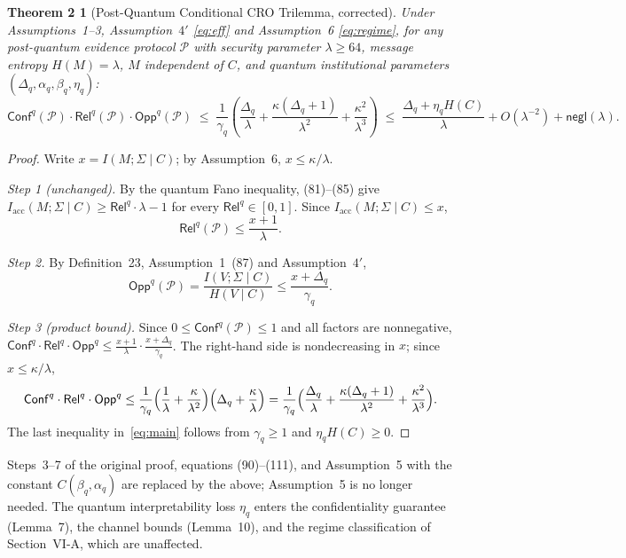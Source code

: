 \documentclass[10pt,a4paper]{article}
\newtheorem*{theoremTwo}{Theorem 2}
\theoremstyle{remark}
\newcommand{\Confq}{\mathsf{Conf}^q}
\newcommand{\Relq}{\mathsf{Rel}^q}
\newcommand{\Oppq}{\mathsf{Opp}^q}
\newcommand{\negl}{\mathsf{negl}}
\newcommand{\cP}{\mathcal{P}}
\newcommand{\IMS}{I(M;\Sigma\mid C)}
\newcommand{\Iacc}{I_{\mathrm{acc}}(M;\Sigma\mid C)}
\begin{document}
\begin{theoremTwo}[Post-Quantum Conditional CRO Trilemma, corrected]
Under Assumptions~1--3, Assumption~$4'$ \eqref{eq:eff} and
Assumption~6 \eqref{eq:regime}, for any post-quantum evidence protocol
$\cP$ with security parameter $\lambda\ge64$, message entropy
$H(M)=\lambda$, $M$ independent of $C$, and quantum institutional
parameters $(\Delta_q,\alpha_q,\beta_q,\eta_q)$:
\begin{equation*}\tag{80$'$}\label{eq:main}
\Confq(\cP)\cdot\Relq(\cP)\cdot\Oppq(\cP)
\;\le\;\frac{1}{\gamma_q}\left(\frac{\Delta_q}{\lambda}
+\frac{\kappa(\Delta_q+1)}{\lambda^{2}}+\frac{\kappa^{2}}{\lambda^{3}}\right)
\;\le\;\frac{\Delta_q+\eta_q H(C)}{\lambda}+O(\lambda^{-2})+\negl(\lambda).
\end{equation*}
\end{theoremTwo}

\begin{proof}
Write $x=\IMS$; by Assumption~6, $x\le\kappa/\lambda$.

\emph{Step 1 (unchanged).} By the quantum Fano inequality, (81)--(85) give
$\Iacc\ge\Relq\cdot\lambda-1$ for every $\Relq\in[0,1]$. Since
$\Iacc\le x$,
\begin{equation*}\tag{85$'$}
\Relq(\cP)\le\frac{x+1}{\lambda}.
\end{equation*}

\emph{Step 2.} By Definition~23, Assumption~1~(87) and
Assumption~$4'$,
\begin{equation*}\tag{89$'$}
\Oppq(\cP)=\frac{I(V;\Sigma\mid C)}{H(V\mid C)}\le\frac{x+\Delta_q}{\gamma_q}.
\end{equation*}

\emph{Step 3 (product bound).} Since $0\le\Confq(\cP)\le1$ and all factors
are nonnegative,
$\Confq\cdot\Relq\cdot\Oppq\le\frac{x+1}{\lambda}\cdot\frac{x+\Delta_q}{\gamma_q}$.
The right-hand side is nondecreasing in $x$; since $x\le\kappa/\lambda$,
\[
\Confq\cdot\Relq\cdot\Oppq\le\frac1{\gamma_q}
\Bigl(\frac1\lambda+\frac{\kappa}{\lambda^2}\Bigr)
\Bigl(\Delta_q+\frac{\kappa}{\lambda}\Bigr)
=\frac1{\gamma_q}\Bigl(\frac{\Delta_q}{\lambda}
+\frac{\kappa(\Delta_q+1)}{\lambda^2}+\frac{\kappa^2}{\lambda^3}\Bigr).
\]
The last inequality in~\eqref{eq:main} follows from $\gamma_q\ge1$ and
$\eta_qH(C)\ge0$.
\end{proof}

\noindent Steps~3--7 of the original proof, equations (90)--(111), and
Assumption~5 with the constant $C(\beta_q,\alpha_q)$ are replaced by the
above; Assumption~5 is no longer needed. The quantum interpretability loss
$\eta_q$ enters the confidentiality guarantee (Lemma~7), the channel
bounds (Lemma~10), and the regime classification of
Section~VI-A, which are unaffected.
\end{document}
